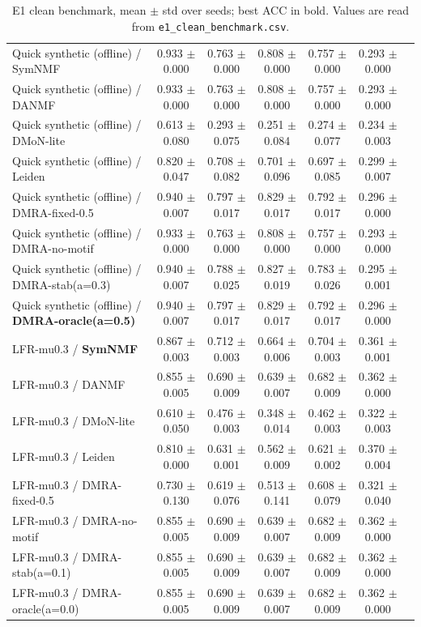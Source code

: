 \documentclass[11pt,a4paper]{article}
\begin{document}
\begin{table}[H]
{\begin{tabular}{lcccccc}
\midrule
Quick synthetic (offline) / SymNMF & 0.933 $\pm$ 0.000 & 0.763 $\pm$ 0.000 & 0.808 $\pm$ 0.000 & 0.757 $\pm$ 0.000 & 0.293 $\pm$ 0.000 \\
Quick synthetic (offline) / DANMF & 0.933 $\pm$ 0.000 & 0.763 $\pm$ 0.000 & 0.808 $\pm$ 0.000 & 0.757 $\pm$ 0.000 & 0.293 $\pm$ 0.000 \\
Quick synthetic (offline) / DMoN-lite & 0.613 $\pm$ 0.080 & 0.293 $\pm$ 0.075 & 0.251 $\pm$ 0.084 & 0.274 $\pm$ 0.077 & 0.234 $\pm$ 0.003 \\
Quick synthetic (offline) / Leiden & 0.820 $\pm$ 0.047 & 0.708 $\pm$ 0.082 & 0.701 $\pm$ 0.096 & 0.697 $\pm$ 0.085 & 0.299 $\pm$ 0.007 \\
Quick synthetic (offline) / DMRA-fixed-0.5 & 0.940 $\pm$ 0.007 & 0.797 $\pm$ 0.017 & 0.829 $\pm$ 0.017 & 0.792 $\pm$ 0.017 & 0.296 $\pm$ 0.000 \\
Quick synthetic (offline) / DMRA-no-motif & 0.933 $\pm$ 0.000 & 0.763 $\pm$ 0.000 & 0.808 $\pm$ 0.000 & 0.757 $\pm$ 0.000 & 0.293 $\pm$ 0.000 \\
Quick synthetic (offline) / DMRA-stab(a=0.3) & 0.940 $\pm$ 0.007 & 0.788 $\pm$ 0.025 & 0.827 $\pm$ 0.019 & 0.783 $\pm$ 0.026 & 0.295 $\pm$ 0.001 \\
Quick synthetic (offline) / \textbf{DMRA-oracle(a=0.5)} & 0.940 $\pm$ 0.007 & 0.797 $\pm$ 0.017 & 0.829 $\pm$ 0.017 & 0.792 $\pm$ 0.017 & 0.296 $\pm$ 0.000 \\
\midrule
LFR-mu0.3 / \textbf{SymNMF} & 0.867 $\pm$ 0.003 & 0.712 $\pm$ 0.003 & 0.664 $\pm$ 0.006 & 0.704 $\pm$ 0.003 & 0.361 $\pm$ 0.001 \\
LFR-mu0.3 / DANMF & 0.855 $\pm$ 0.005 & 0.690 $\pm$ 0.009 & 0.639 $\pm$ 0.007 & 0.682 $\pm$ 0.009 & 0.362 $\pm$ 0.000 \\
LFR-mu0.3 / DMoN-lite & 0.610 $\pm$ 0.050 & 0.476 $\pm$ 0.003 & 0.348 $\pm$ 0.014 & 0.462 $\pm$ 0.003 & 0.322 $\pm$ 0.003 \\
LFR-mu0.3 / Leiden & 0.810 $\pm$ 0.000 & 0.631 $\pm$ 0.001 & 0.562 $\pm$ 0.009 & 0.621 $\pm$ 0.002 & 0.370 $\pm$ 0.004 \\
LFR-mu0.3 / DMRA-fixed-0.5 & 0.730 $\pm$ 0.130 & 0.619 $\pm$ 0.076 & 0.513 $\pm$ 0.141 & 0.608 $\pm$ 0.079 & 0.321 $\pm$ 0.040 \\
LFR-mu0.3 / DMRA-no-motif & 0.855 $\pm$ 0.005 & 0.690 $\pm$ 0.009 & 0.639 $\pm$ 0.007 & 0.682 $\pm$ 0.009 & 0.362 $\pm$ 0.000 \\
LFR-mu0.3 / DMRA-stab(a=0.1) & 0.855 $\pm$ 0.005 & 0.690 $\pm$ 0.009 & 0.639 $\pm$ 0.007 & 0.682 $\pm$ 0.009 & 0.362 $\pm$ 0.000 \\
LFR-mu0.3 / DMRA-oracle(a=0.0) & 0.855 $\pm$ 0.005 & 0.690 $\pm$ 0.009 & 0.639 $\pm$ 0.007 & 0.682 $\pm$ 0.009 & 0.362 $\pm$ 0.000 \\
\bottomrule
\end{tabular}%
}
\caption{E1 clean benchmark, mean $\pm$ std over seeds; best ACC in bold. Values are read from \texttt{e1\_clean\_benchmark.csv}.}
\label{tab:e1}
\end{table}
\end{document}
